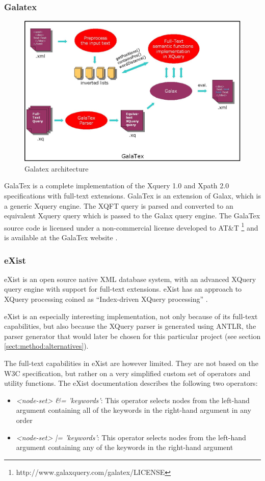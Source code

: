 \subsubsection{Galatex}
\begin{figure}[!h]
  \centering
    \includegraphics[width=1\textwidth]{img/galatex_architecture.png}
  \caption{Galatex architecture}
\end{figure}
GalaTex is a complete implementation of the Xquery 1.0 and Xpath 2.0
specifications with full-text extensions. GalaTex is an extension of Galax,
which is a generic Xquery engine. The XQFT query is parsed and converted to an
equivalent Xquery query which is passed to the Galax query engine. The GalaTex
source code is licensed under a non-commercial license developed to AT\&{}T 
\footnote{http://www.galaxquery.com/galatex/LICENSE} and is available at the
GalaTex website \cite{galatex}.

\subsubsection{eXist}
eXist is an open source native XML database system, with an advanced XQuery
query engine with support for full-text extensions. eXist has an approach to
XQuery processing coined as ``Index-driven XQuery processing''
\cite{exist_idx_drv_query}.

eXist is an especially interesting implementation, not only because of its
full-text capabilities, but also because the XQuery parser is generated using
ANTLR, the parser generator that would later be chosen for this particular
project (see section \ref{sect:method:alternatives}).

The full-text capabilities in eXist are however limited. They are not based on
the W3C specification, but rather on a very simplified custom set of operators
and utility functions. The eXist documentation\cite{exist_doc} describes the
following two operators:
\begin{itemize}
  \item \emph{<node-set> \&= 'keywords'}: This operator selects nodes from the
  left-hand argument containing all of the keywords in the right-hand argument 
  in any order
  \item \emph{<node-set> |= 'keywords'}: This operator selects nodes from the
  left-hand argument containing any of the keywords in the right-hand argument
\end{itemize}

